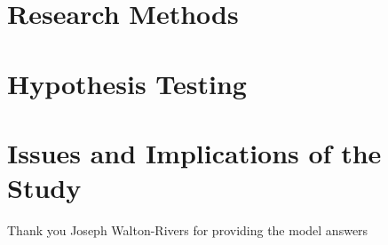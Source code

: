 \documentclass[manuscript,screen,review,sigconf]{acmart}
\begin{document}

\section{Research Methods}



\section{Hypothesis Testing}

\section{Issues and Implications of the Study}
%



\begin{acks}
Thank you Joseph Walton-Rivers for providing the model answers
\end{acks}



\end{document}
